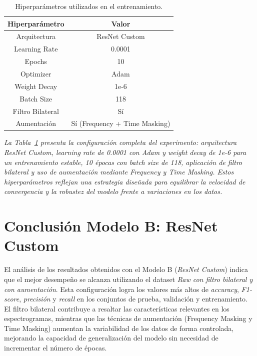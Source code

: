\documentclass[conference]{IEEEtran}
\begin{document}
\begin{table}[H]
    \centering
    \begin{tabular}{|c|c|}
        \hline
        \textbf{Hiperparámetro} & \textbf{Valor} \\
        \hline
        Arquitectura       & ResNet Custom \\
        Learning Rate      & 0.0001        \\
        Epochs             & 10            \\
        Optimizer          & Adam          \\
        Weight Decay       & 1e-6          \\
        Batch Size         & 118           \\
        Filtro Bilateral   & Sí            \\
        Aumentación        & Sí (Frequency + Time Masking) \\
        \hline
    \end{tabular}
    \caption{Hiperparámetros utilizados en el entrenamiento.}
    \label{tab:resnet_bilateral_with_hparams}
\end{table}
\noindent\textit{%
La Tabla~\ref{tab:resnet_bilateral_with_hparams} presenta la configuración completa del experimento: arquitectura ResNet Custom, learning rate de 0.0001 con Adam y weight decay de 1e-6 para un entrenamiento estable, 10 épocas con batch size de 118, aplicación de filtro bilateral y uso de aumentación mediante Frequency y Time Masking. Estos hiperparámetros reflejan una estrategia diseñada para equilibrar la velocidad de convergencia y la robustez del modelo frente a variaciones en los datos.%
}

\section{Conclusión Modelo B: ResNet Custom}

El análisis de los resultados obtenidos con el Modelo B (\emph{ResNet Custom}) indica que el mejor desempeño se alcanza utilizando el dataset \emph{Raw con filtro bilateral y con aumentación}. Esta configuración logra los valores más altos de \emph{accuracy}, \emph{F1-score}, \emph{precisión} y \emph{recall} en los conjuntos de prueba, validación y entrenamiento. El filtro bilateral contribuye a resaltar las características relevantes en los espectrogramas, mientras que las técnicas de aumentación (Frequency Masking y Time Masking) aumentan la variabilidad de los datos de forma controlada, mejorando la capacidad de generalización del modelo sin necesidad de incrementar el número de épocas.
\end{document}

